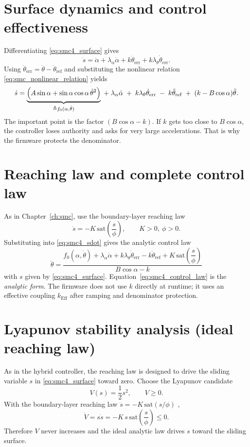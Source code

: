 \section{Surface dynamics and control effectiveness}
Differentiating \eqref{eq:smc4_surface} gives
\begin{equation}
\dot{s} = \ddot{\alpha} + \lambda_{\alpha}\dot{\alpha}
        + k\ddot{\theta}_{\mathrm{err}} + k\lambda_{\theta}\dot{\theta}_{\mathrm{err}}.
\label{eq:smc4_sdot_start}
\end{equation}
Using $\ddot{\theta}_{\mathrm{err}}=\ddot{\theta}-\ddot{\theta}_{\mathrm{ref}}$ and substituting the nonlinear relation \eqref{eq:smc_nonlinear_relation} yields
\begin{equation}
\dot{s}
=
\underbrace{\Bigl(A\sin\alpha+\sin\alpha\cos\alpha\,\dot{\theta}^2\Bigr)}_{\triangleq f_0(\alpha,\dot{\theta})}
\;+\;
\lambda_{\alpha}\dot{\alpha}
\;+\;
k\lambda_{\theta}\dot{\theta}_{\mathrm{err}}
\;-\;
k\ddot{\theta}_{\mathrm{ref}}
\;+\;
(k-B\cos\alpha)\ddot{\theta}.
\label{eq:smc4_sdot}
\end{equation}
The important point is the factor $(B\cos\alpha-k)$. If $k$ gets too close to $B\cos\alpha$, the controller loses authority and asks for very large accelerations. That is why the firmware protects the denominator.

\section{Reaching law and complete control law}
As in Chapter~\ref{ch:smc}, use the boundary-layer reaching law
\[
\dot{s} = -K\,\mathrm{sat}\!\left(\frac{s}{\phi}\right),\qquad K>0,\ \phi>0.
\]
Substituting into \eqref{eq:smc4_sdot} gives the analytic control law
\begin{equation}
\boxed{
\ddot{\theta}
  =
  \frac{
    f_0(\alpha,\dot{\theta})
    + \lambda_{\alpha}\dot{\alpha}
    + k\lambda_{\theta}\dot{\theta}_{\mathrm{err}}
    - k\ddot{\theta}_{\mathrm{ref}}
    + K\,\mathrm{sat}\!\left(\dfrac{s}{\phi}\right)
  }{
    B\cos\alpha - k
  }
}
\label{eq:smc4_control_law}
\end{equation}
with $s$ given by \eqref{eq:smc4_surface}. Equation~\eqref{eq:smc4_control_law} is the \emph{analytic form}. The firmware does not use $k$ directly at runtime; it uses an effective coupling $k_{\mathrm{Eff}}$ after ramping and denominator protection.

\section{Lyapunov stability analysis (ideal reaching law)}
As in the hybrid controller, the reaching law is designed to drive the sliding variable $s$ in \eqref{eq:smc4_surface} toward zero. Choose the Lyapunov candidate
\[
V(s)=\frac{1}{2}s^2,\qquad V\ge 0.
\]
With the boundary-layer reaching law $\dot{s}=-K\,\mathrm{sat}(s/\phi)$ \cite{utkin1992,slotine1991,Young1999},
\[
\dot{V}=s\dot{s}=-K\,s\,\mathrm{sat}\!\left(\frac{s}{\phi}\right)\le 0.
\]
Therefore $V$ never increases and the ideal analytic law drives $s$ toward the sliding surface.

